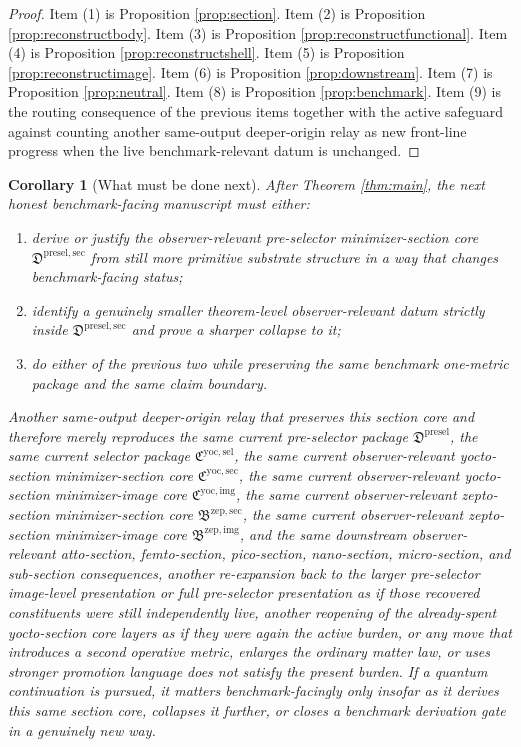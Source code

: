 \documentclass[11pt]{article}
\newcommand{\ZeptoImageCore}{\mathfrak B^{\mathrm{zep,img}}}
\newcommand{\ZeptoMinSectionCore}{\mathfrak B^{\mathrm{zep,sec}}}
\newcommand{\YoctoImageCore}{\mathfrak C^{\mathrm{yoc,img}}}
\newcommand{\YoctoMinSectionCore}{\mathfrak C^{\mathrm{yoc,sec}}}
\newcommand{\YoctoSelectorPackage}{\mathfrak C^{\mathrm{yoc,sel}}}
\newcommand{\PreSelectorPackage}{\mathfrak D^{\mathrm{presel}}}
\newcommand{\PreSelectorMinSectionCore}{\mathfrak D^{\mathrm{presel,sec}}}
\newtheorem{corollary}{Corollary}
\begin{document}
\begin{proof}
Item (1) is Proposition \ref{prop:section}. Item (2) is Proposition \ref{prop:reconstructbody}. Item (3) is Proposition \ref{prop:reconstructfunctional}. Item (4) is Proposition \ref{prop:reconstructshell}. Item (5) is Proposition \ref{prop:reconstructimage}. Item (6) is Proposition \ref{prop:downstream}. Item (7) is Proposition \ref{prop:neutral}. Item (8) is Proposition \ref{prop:benchmark}. Item (9) is the routing consequence of the previous items together with the active safeguard against counting another same-output deeper-origin relay as new front-line progress when the live benchmark-relevant datum is unchanged.
\end{proof}

\begin{corollary}[What must be done next]
\label{cor:next}
After Theorem \ref{thm:main}, the next honest benchmark-facing manuscript must either:
\begin{enumerate}
    \item derive or justify the observer-relevant pre-selector minimizer-section core \(\PreSelectorMinSectionCore\) from still more primitive substrate structure in a way that changes benchmark-facing status;
    \item identify a genuinely smaller theorem-level observer-relevant datum strictly inside \(\PreSelectorMinSectionCore\) and prove a sharper collapse to it;
    \item do either of the previous two while preserving the same benchmark one-metric package and the same claim boundary.
\end{enumerate}
Another same-output deeper-origin relay that preserves this section core and therefore merely reproduces the same current pre-selector package \(\PreSelectorPackage\), the same current selector package \(\YoctoSelectorPackage\), the same current observer-relevant yocto-section minimizer-section core \(\YoctoMinSectionCore\), the same current observer-relevant yocto-section minimizer-image core \(\YoctoImageCore\), the same current observer-relevant zepto-section minimizer-section core \(\ZeptoMinSectionCore\), the same current observer-relevant zepto-section minimizer-image core \(\ZeptoImageCore\), and the same downstream observer-relevant atto-section, femto-section, pico-section, nano-section, micro-section, and sub-section consequences, another re-expansion back to the larger pre-selector image-level presentation or full pre-selector presentation as if those recovered constituents were still independently live, another reopening of the already-spent yocto-section core layers as if they were again the active burden, or any move that introduces a second operative metric, enlarges the ordinary matter law, or uses stronger promotion language does not satisfy the present burden. If a quantum continuation is pursued, it matters benchmark-facingly only insofar as it derives this same section core, collapses it further, or closes a benchmark derivation gate in a genuinely new way.
\end{corollary}
\end{document}
